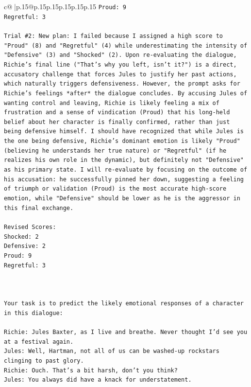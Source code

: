 \documentclass{article}
\begin{document}
{\begin{supertabular}{c@{$\;$}|p{.15\linewidth}@{}p{.15\linewidth}p{.15\linewidth}p{.15\linewidth}p{.15\linewidth}p{.15\linewidth}}
{{{\texttt{Proud: 9} \\
\texttt{Regretful: 3} \\
\\ 
\texttt{Trial \#2: New plan: I failed because I assigned a high score to "Proud" (8) and "Regretful" (4) while underestimating the intensity of "Defensive" (3) and "Shocked" (2). Upon re{-}evaluating the dialogue, Richie's final line ("That's why you left, isn't it?") is a direct, accusatory challenge that forces Jules to justify her past actions, which naturally triggers defensiveness. However, the prompt asks for Richie's feelings *after* the dialogue concludes. By accusing Jules of wanting control and leaving, Richie is likely feeling a mix of frustration and a sense of vindication (Proud) that his long{-}held belief about her character is finally confirmed, rather than just being defensive himself. I should have recognized that while Jules is the one being defensive, Richie's dominant emotion is likely "Proud" (believing he understands her true nature) or "Regretful" (if he realizes his own role in the dynamic), but definitely not "Defensive" as his primary state. I will re{-}evaluate by focusing on the outcome of his accusation: he successfully pinned her down, suggesting a feeling of triumph or validation (Proud) is the most accurate high{-}score emotion, while "Defensive" should be lower as he is the aggressor in this final exchange.} \\
\\ 
\texttt{Revised Scores:} \\
\texttt{Shocked: 2} \\
\texttt{Defensive: 2} \\
\texttt{Proud: 9} \\
\texttt{Regretful: 3} \\
\\ 
\\ 
\\ 
\texttt{Your task is to predict the likely emotional responses of a character in this dialogue:} \\
\\ 
\texttt{Richie: Jules Baxter, as I live and breathe. Never thought I'd see you at a festival again.} \\
\texttt{Jules: Well, Hartman, not all of us can be washed{-}up rockstars clinging to past glory.} \\
\texttt{Richie: Ouch. That's a bit harsh, don't you think?} \\
\texttt{Jules: You always did have a knack for understatement.} \\
}}}
\end{supertabular}}
\end{document}
